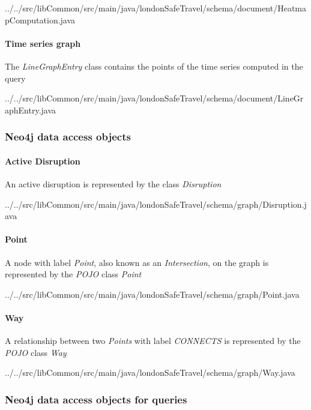 
{../../src/libCommon/src/main/java/londonSafeTravel/schema/document/HeatmapComputation.java}

\paragraph{Time series graph}
The \textit{LineGraphEntry} class contains the points of the time series 
computed in the query


{../../src/libCommon/src/main/java/londonSafeTravel/schema/document/LineGraphEntry.java}

\subsubsection{Neo4j data access objects}

\paragraph{Active Disruption}
An active disruption is represented by the class \textit{Disruption}


{../../src/libCommon/src/main/java/londonSafeTravel/schema/graph/Disruption.java}

\paragraph{Point}
A node with label \textit{Point}, also known as an \textit{Intersection}, on 
the graph is represented by the \textit{POJO} class \textit{Point}


{../../src/libCommon/src/main/java/londonSafeTravel/schema/graph/Point.java}

\paragraph{Way}
A relationship between two \textit{Points} with label \textit{CONNECTS} is 
represented by the \textit{POJO} class \textit{Way}


{../../src/libCommon/src/main/java/londonSafeTravel/schema/graph/Way.java}

\subsubsection{Neo4j data access objects for queries}

